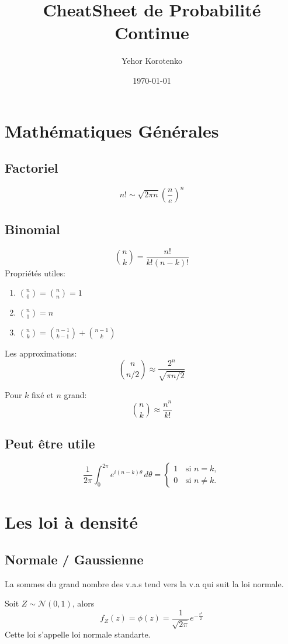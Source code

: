 \documentclass[a4paper]{article}
\title{CheatSheet de Probabilité Continue}
\author{Yehor Korotenko}
\date{\today}
\begin{document}
\maketitle
\section{Mathématiques Générales} 
\subsection{Factoriel}
\[
    n! \sim \sqrt{2\pi n}\left(\frac{n}{e}\right)^n 
\] 

\subsection{Binomial}
\[
    \binom{n}{k} = \frac{n!}{k!(n-k)!}
\] 
Propriétés utiles:
\begin{enumerate}
    \item $\binom{n}{0} = \binom{n}{n} = 1$
    \item $\binom{n}{1} = n$ 
    \item $\binom{n}{k} = \binom{n-1}{k-1} + \binom{n-1}{k}$
\end{enumerate}

Les approximations:
\[
    \binom{n}{n/2}\approx \frac{2^n}{\sqrt{\pi n/2}}
\] 

Pour $k$ fixé et  $n$ grand:
 \[
     \binom{n}{k} \approx \frac{n^n}{k!}
\] 

\subsection{Peut être utile}
\[
\frac{1}{2\pi}\int_{0}^{2\pi} e^{i(n-k)\theta}\, d\theta =
\begin{cases}
1\, & \text{si } n=k,\\
0\, & \text{si } n\ne k .
\end{cases}
\]


\section{Les loi à densité}%
\label{sec:Les loi à densité}
\subsection{Normale / Gaussienne}
La sommes du grand nombre des v.a.s tend vers la v.a qui suit la loi normale.

Soit $Z \sim \mathcal{N}(0, 1)$, alors
 \[
     f_Z(z) = \phi(z) = \frac{1}{\sqrt{2 \pi} }e^{-\frac{z^2}{2}}
\] 
Cette loi s'appelle loi normale standarte.
\end{document}
